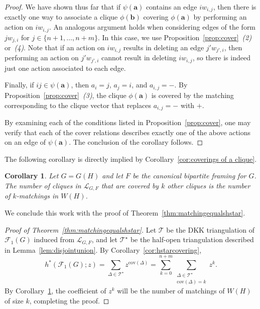 \documentclass[12pt]{amsart}
\newtheorem{corollary}[theorem]{Corollary}
\theoremstyle{definition}
\newcommand\ba{\mathbf{a}}
\newcommand\bb{\mathbf{b}}
\newcommand\calF{\mathcal{F}}
\newcommand\calT{\mathcal{T}}
\newcommand{\scrL}{\mathscr{L}}
\newcommand{\cov}{\mathrm{cov}}
\begin{document}
\begin{proof}
    We have shown thus far that if $\psi(\ba)$ contains an edge $iw_{i,j}$, then there is exactly one way to associate a clique $\phi(\bb)$ covering $\phi(\ba)$ by performing an action on $iw_{i,j}$.
    An analogous argument holds when considering edges of the form $jw_{j,i}$ for $j \in \{n+1,\dots,n+m\}$.
    In this case, we use Proposition~\ref{prop:cover}~\emph{(2)} or~\emph{(4)}.
    Note that if an action on $iw_{i,j}$ results in deleting an edge $j'w_{j',i}$, then performing an action on $j'w_{j',i}$ cannot result in deleting $iw_{i,j}$, so there is indeed just one action associated to each edge. 
    
    Finally, if $ij \in \psi(\ba)$, then $a_i = j$, $a_j = i$, and $a_{i,j} = -$.
    By Proposition~\ref{prop:cover}~\emph{(3)}, the clique $\phi(\ba)$ is covered by the matching corresponding to the clique vector that replaces $a_{i,j} = -$ with $+$.

    By examining each of the conditions listed in Proposition~\ref{prop:cover}, one may verify that each of the cover relations describes exactly one of the above actions on an edge of $\psi(\ba)$.
    The conclusion of the corollary follows.
\end{proof}

The following corollary is directly implied by Corollary~\ref{cor:coverings of a clique}.

\begin{corollary}\label{cor:coveringsequalsmatchings}
    Let $G = G(H)$ and let $F$ be the canonical bipartite framing for $G$.
    The number of cliques in $\scrL_{G,F}$ that are covered by $k$ other cliques is the number of $k$-matchings in $W(H)$.
\end{corollary}

We conclude this work with the proof of Theorem~\ref{thm:matchingequalshstar}.

\begin{proof}[Proof of Theorem~\ref{thm:matchingequalshstar}]
    Let $\calT$ be the DKK triangulation of $\calF_1(G)$ induced from $\scrL_{G,F}$, and let $\calT^{\star}$ be the half-open triangulation described in Lemma~\ref{lem:disjointunion}.
    By Corollary~\ref{cor:hstarcovering},
    \[
        h^*(\calF_1(G);z) = \sum_{\Delta \in \calT^{\star}} z^{\cov(\Delta)} = \sum_{k=0}^{n+m} \sum_{\substack{\Delta \in \calT^{\star} \\ \cov(\Delta) = k}} z^k.
    \]
    By Corollary~\ref{cor:coveringsequalsmatchings}, the coefficient of $z^k$ will be the number of matchings of $W(H)$ of size $k$, completing the proof.
\end{proof}



\end{document}
